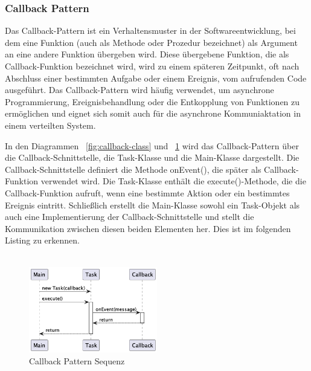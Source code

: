 \documentclass[../vs-script-first-v01.tex]{subfiles}
\begin{document}
\subsubsection{Callback Pattern}
Das Callback-Pattern ist ein Verhaltensmuster in der Softwareentwicklung, bei dem eine Funktion (auch als Methode oder Prozedur bezeichnet) als Argument an eine andere Funktion übergeben wird. Diese übergebene Funktion, die als Callback-Funktion bezeichnet wird, wird zu einem späteren Zeitpunkt, oft nach Abschluss einer bestimmten Aufgabe oder einem Ereignis, vom aufrufenden Code ausgeführt. Das Callback-Pattern wird häufig verwendet, um asynchrone Programmierung, Ereignisbehandlung oder die Entkopplung von Funktionen zu ermöglichen und eignet sich somit auch für die asynchrone Kommuniaktation in einem verteilten System.



In den Diagrammen ~\ref{fig:callback-class} und ~\ref{fig:callback-seq} wird das Callback-Pattern über die Callback-Schnittstelle, die Task-Klasse und die Main-Klasse dargestellt. Die Callback-Schnittstelle definiert die Methode onEvent(), die später als Callback-Funktion verwendet wird. Die Task-Klasse enthält die execute()-Methode, die die Callback-Funktion aufruft, wenn eine bestimmte Aktion oder ein bestimmtes Ereignis eintritt. Schließlich erstellt die Main-Klasse sowohl ein Task-Objekt als auch eine Implementierung der Callback-Schnittstelle und stellt die Kommunikation zwischen diesen beiden Elementen her. Dies ist im folgenden Listing zu erkennen.\\\\
\begin{figure}[htb]
  \centering
  \includegraphics[width=0.50\textwidth]{fig/uml/callback-seq.png}
  \caption{Callback Pattern Sequenz}
  \label{fig:callback-seq}
\end{figure}
\end{document}
